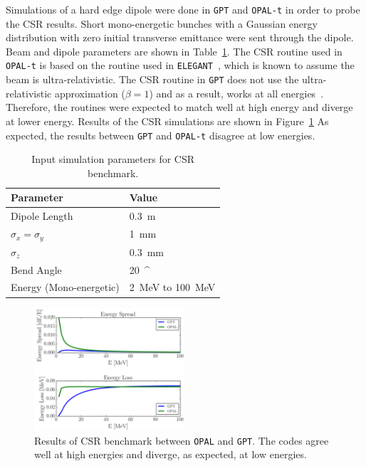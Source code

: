 Simulations of a hard edge dipole were done in \verb|GPT|  
and \verb|OPAL-t| in order to probe the CSR results.
Short mono-energetic bunches with a Gaussian energy distribution with zero initial transverse emittance  
were sent through the dipole.  Beam and dipole parameters are shown in Table~\ref{tab:benchcsr}. 
The CSR routine used in \verb|OPAL-t| is based on the routine used in \verb|ELEGANT|~\cite{elegant}, 
which is known to assume the beam is ultra-relativistic. The CSR routine in \verb|GPT|  
does not use the ultra-relativistic approximation ($\beta=1$) 
and as a result, works at all energies~\cite{gptcsr}.  
Therefore, the routines were expected to match well at high energy and  
diverge at lower energy. Results of the CSR simulations are shown in Figure~\ref{fig:csr}  
As expected, the results between \verb|GPT| and \verb|OPAL-t| disagree at low energies. 
\begin{table}
	\begin{center}

		\caption{Input simulation parameters for CSR benchmark.}
		\label{tab:benchcsr}
		\begin{tabular}{l l} 
			\toprule
			\toprule
			\textbf{Parameter} & \textbf{Value} \\ 
			\midrule
			Dipole Length & \SI{0.3}{m} \\
			$\sigma_x =\sigma_y$ & \SI{1}{mm} \\
			$\sigma_z$ 			 & \SI{0.3}{mm} \\
			Bend Angle 			 & \SI{20}{^\circ} \\
			Energy (Mono-energetic)	 & \SI{2}{MeV} to \SI{100}{MeV} \\
			\bottomrule			
		\end{tabular}
	\end{center}
\end{table}
\begin{figure}
	\centering
	\includegraphics[width=0.5\textwidth]{./images/CSR}
	\cprotect\caption{Results of CSR benchmark between \verb|OPAL| and \verb|GPT|.
	The codes agree well at high energies and diverge, as expected, at low energies.}
	\label{fig:csr}
\end{figure}

